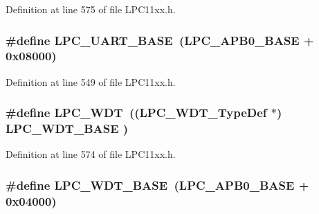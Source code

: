 Definition at line 575 of file L\+P\+C11xx.\+h.

\subsubsection[{\texorpdfstring{L\+P\+C\+\_\+\+U\+A\+R\+T\+\_\+\+B\+A\+SE}{LPC_UART_BASE}}]{\setlength{\rightskip}{0pt plus 5cm}\#define L\+P\+C\+\_\+\+U\+A\+R\+T\+\_\+\+B\+A\+SE~({\bf L\+P\+C\+\_\+\+A\+P\+B0\+\_\+\+B\+A\+SE} + 0x08000)}\hypertarget{group___l_p_c11xx___definitions_ga50ba023c2b0046a5be8b1b236effeb35}{}\label{group___l_p_c11xx___definitions_ga50ba023c2b0046a5be8b1b236effeb35}


Definition at line 549 of file L\+P\+C11xx.\+h.

\subsubsection[{\texorpdfstring{L\+P\+C\+\_\+\+W\+DT}{LPC_WDT}}]{\setlength{\rightskip}{0pt plus 5cm}\#define L\+P\+C\+\_\+\+W\+DT~(({\bf L\+P\+C\+\_\+\+W\+D\+T\+\_\+\+Type\+Def}    $\ast$) {\bf L\+P\+C\+\_\+\+W\+D\+T\+\_\+\+B\+A\+SE}   )}\hypertarget{group___l_p_c11xx___definitions_ga7d68cf0829652bd8c1f837c697653c5f}{}\label{group___l_p_c11xx___definitions_ga7d68cf0829652bd8c1f837c697653c5f}


Definition at line 574 of file L\+P\+C11xx.\+h.

\subsubsection[{\texorpdfstring{L\+P\+C\+\_\+\+W\+D\+T\+\_\+\+B\+A\+SE}{LPC_WDT_BASE}}]{\setlength{\rightskip}{0pt plus 5cm}\#define L\+P\+C\+\_\+\+W\+D\+T\+\_\+\+B\+A\+SE~({\bf L\+P\+C\+\_\+\+A\+P\+B0\+\_\+\+B\+A\+SE} + 0x04000)}\hypertarget{group___l_p_c11xx___definitions_ga02a30b0be4672972c3af9e5aebdcfea1}{}\label{group___l_p_c11xx___definitions_ga02a30b0be4672972c3af9e5aebdcfea1}


